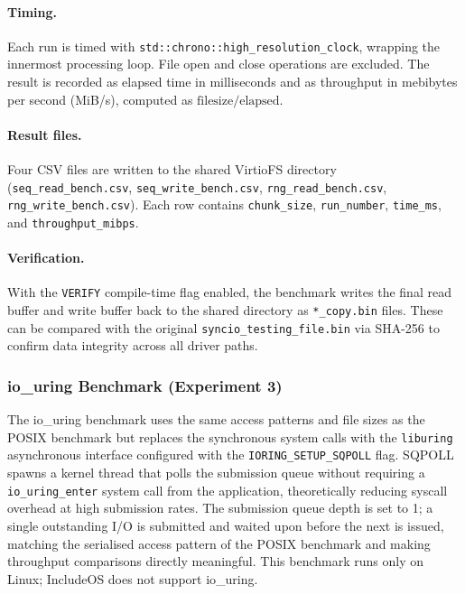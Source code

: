 \paragraph{Timing.}  Each run is timed with
\texttt{std::chrono::high\_resolution\_clock}, wrapping the innermost
processing loop.  File open and close operations are excluded.  The result
is recorded as elapsed time in milliseconds and as throughput in
mebibytes per second (MiB/s), computed as $\text{filesize} /
\text{elapsed}$.

\paragraph{Result files.}  Four CSV files are written to the shared
VirtioFS directory (\texttt{seq\_read\_bench.csv},
\texttt{seq\_write\_bench.csv}, \texttt{rng\_read\_bench.csv},
\texttt{rng\_write\_bench.csv}).  Each row contains
\texttt{chunk\_size}, \texttt{run\_number}, \texttt{time\_ms}, and
\texttt{throughput\_mibps}.

\paragraph{Verification.} With the \texttt{VERIFY} compile-time flag
enabled, the benchmark writes the final read buffer and write buffer back
to the shared directory as \texttt{*\_copy.bin} files.  These can be
compared with the original \texttt{syncio\_testing\_file.bin} via SHA-256
to confirm data integrity across all driver paths.

\subsubsection{io\_uring Benchmark (Experiment 3)}
\label{sec:iouring_setup}

The io\_uring benchmark uses the same access patterns and file sizes as
the POSIX benchmark but replaces the synchronous system calls with the
\texttt{liburing} asynchronous interface configured with the
\texttt{IORING\_SETUP\_SQPOLL} flag.  SQPOLL spawns a kernel thread that
polls the submission queue without requiring a \texttt{io\_uring\_enter}
system call from the application, theoretically reducing syscall overhead
at high submission rates.  The submission queue depth is set to 1; a
single outstanding I/O is submitted and waited upon before the next is
issued, matching the serialised access pattern of the POSIX benchmark and
making throughput comparisons directly meaningful.  This benchmark runs
only on Linux; IncludeOS does not support io\_uring.

